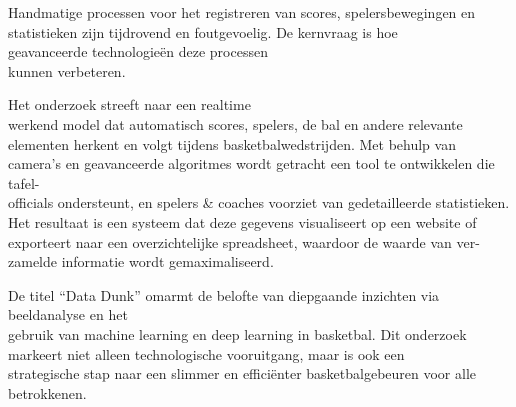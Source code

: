 Handmatige processen voor het registreren van scores, spelersbewegingen en statistieken zijn tijdrovend en foutgevoelig. De kernvraag is hoe \\geavanceerde technologieën deze processen \\kunnen verbeteren.

Het onderzoek streeft naar een realtime \\werkend model dat automatisch scores, spelers, de bal en andere relevante elementen herkent en volgt tijdens basketbalwedstrijden. 
Met behulp van camera's en geavanceerde algoritmes wordt getracht een tool te ontwikkelen die tafel-\\officials ondersteunt, en spelers \& coaches voorziet van gedetailleerde statistieken. Het resultaat is een systeem dat deze gegevens visualiseert op een website of exporteert naar een overzichtelijke spreadsheet, waardoor de waarde van ver-\\zamelde informatie wordt gemaximaliseerd.

De titel ``Data Dunk'' omarmt de belofte van diepgaande inzichten via beeldanalyse en het \\gebruik van machine learning en deep learning in basketbal. Dit onderzoek markeert niet alleen technologische vooruitgang, maar is ook een \\strategische stap naar een slimmer en efficiënter basketbalgebeuren voor alle betrokkenen.

